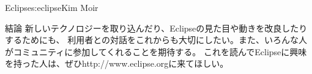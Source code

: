 \begin{aosachapter}{Eclipse}{s:eclipse}{Kim Moir}
\begin{aosasect1}{結論}
新しいテクノロジーを取り込んだり、Eclipseの見た目や動きを改良したりするためにも、
利用者との対話をこれからも大切にしたい。また、いろんな人がコミュニティに参加してくれることを期待する。
これを読んでEclipseに興味を持った人は、ぜひhttp://www.eclipse.orgに来てほしい。
\end{aosasect1}

\end{aosachapter}
